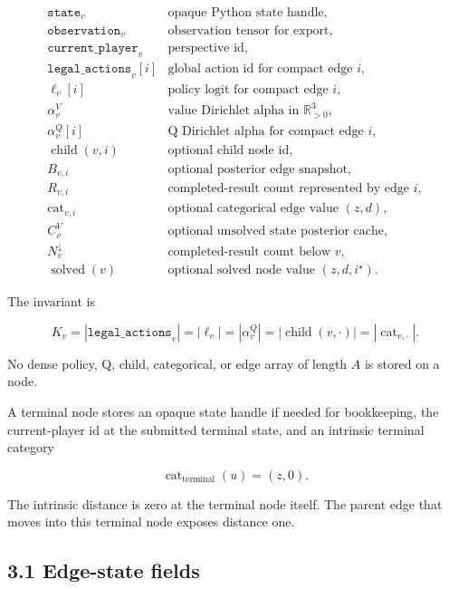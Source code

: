 \documentclass[11pt]{article}
\newcommand{\R}{\mathbb{R}}
\newcommand{\Child}{\operatorname{child}}
\newcommand{\Solved}{\operatorname{solved}}
\newcommand{\Cat}{\operatorname{cat}}
\begin{document}
\[
\begin{array}{ll}
\texttt{state}_v              & \text{opaque Python state handle},\\
\texttt{observation}_v        & \text{observation tensor for export},\\
\texttt{current\_player}_v    & \text{perspective id},\\
\texttt{legal\_actions}_v[i]  & \text{global action id for compact edge }i,\\
\ell_v[i]                    & \text{policy logit for compact edge }i,\\
\alpha_v^V                   & \text{value Dirichlet alpha in }\R_{>0}^3,\\
\alpha_v^Q[i]                & \text{Q Dirichlet alpha for compact edge }i,\\
\Child(v,i)                  & \text{optional child node id},\\
B_{v,i}                      & \text{optional posterior edge snapshot},\\
R_{v,i}                      & \text{completed-result count represented by edge }i,\\
\Cat_{v,i}                   & \text{optional categorical edge value }(z,d),\\
C^V_v                        & \text{optional unsolved state posterior cache},\\
N^\downarrow_v               & \text{completed-result count below }v,\\
\Solved(v)                   & \text{optional solved node value }(z,d,i^\star).
\end{array}
\]

The invariant is

\[
K_v
=|\texttt{legal\_actions}_v|
=|\ell_v|
=|\alpha_v^Q|
=|\Child(v,\cdot)|
=|\Cat_{v,\cdot}|.
\]

No dense policy, Q, child, categorical, or edge array of length \(A\) is stored
on a node.

A terminal node stores an opaque state handle if needed for bookkeeping, the
current-player id at the submitted terminal state, and an intrinsic terminal
category

\[
\Cat_{\mathrm{terminal}}(u)=(z,0).
\]

The intrinsic distance is zero at the terminal node itself. The parent edge that
moves into this terminal node exposes distance one.

\subsection*{3.1 Edge-state fields}
\end{document}
